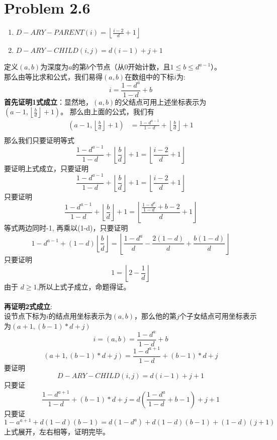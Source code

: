 \documentclass[twocolumn]{ctexart}
\begin{document}
\section*{Problem 2.6}
	\begin{enumerate}
		\item $D-ARY-PARENT(i)=\left\lfloor\frac{i-2}{d}+1\right\rfloor$
		\item $D-ARY-CHILD(i, j)= d(i-1) + j +1$
	\end{enumerate}
	\indent 定义$\left(a,b\right)$为深度为$a$的第$b$个节点（从0开始计数，且$1\leq b \leq d^{a-1}$）。
	\\那么由等比求和公式，我们易得$\left(a,b\right)$在数组中的下标$i$为:
	\begin{displaymath}
		i=\frac{1-d^{a}}{1-d}+b
	\end{displaymath}
	\indent \textbf{首先证明1式成立}：显然地，$\left(a,b\right)$的父结点可用上述坐标表示为$\left(a-1,\left\lfloor\frac{b}{d}\right\rfloor+1\right)$。
	那么由上面的公式，我们有
	\begin{eqnarray*}
		\left(a-1,\left\lfloor\frac{b}{d}\right\rfloor+1\right) &= \frac{1-d^{a-1}}{1-d} +\left\lfloor\frac{b}{d}\right\rfloor +1\\
	\end{eqnarray*}
	那么我们只要证明等式
	\begin{equation*}
		\frac{1-d^{a-1}}{1-d} +\left\lfloor\frac{b}{d}\right\rfloor +1 = \left\lfloor\frac{i-2}{d}+1\right\rfloor
	\end{equation*}
	要证明上式成立，只要证明
	\begin{equation*}
	\frac{1-d^{a-1}}{1-d} +\left\lfloor\frac{b}{d}\right\rfloor +1 = \left\lfloor\frac{i-2}{d}+1\right\rfloor
	\end{equation*}	
	只要证明
		\begin{equation*}
	\frac{1-d^{a-1}}{1-d} +\left\lfloor\frac{b}{d}\right\rfloor +1 = \left\lfloor\frac{\frac{1-d^{a}}{1-d}+b-2}{d}+1\right\rfloor
	\end{equation*}		
	等式两边同时-1,
再乘以(1-d)，只要证明
	\begin{equation*}
	1-d^{a-1}+(1-d)\left\lfloor\frac{b}{d}\right\rfloor=\left\lfloor\frac{1-d^{a}}{d}-\frac{2(1-d)}{d}+\frac{b(1-d)}{d}\right\rfloor
	\end{equation*}
	只要证明
	\begin{equation*}
		1=\left\lfloor2-\frac{1}{d}\right\rfloor
	\end{equation*}
	由于 $d \ge 1$,所以上式子成立，命题得证。\\
	~\\
	\indent \textbf{再证明2式成立}:\\
	设节点下标为$i$的结点用坐标表示为$(a,b)$，那么他的第$j$个子女结点可用坐标表示为$(a+1,(b-1)*d+j)$\\
	\[
		i=(a,b)=\frac{1-d^{a}}{1-d}+b		
	\]
	\[
		(a+1,(b-1)*d+j)=\frac{1-d^{a+1}}{1-d}+(b-1)*d+j
	\]
	要证明
	\[D-ARY-CHILD(i, j)= d(i-1) + j +1\]
	只要证
	\[
		\frac{1-d^{a+1}}{1-d}+(b-1)*d+j=d(\frac{1-d^{a}}{1-d}+b-1)+j+1
	\]
	只要证
	\[
		1-a^{a+1}+d(1-d)(b-1)=d(1-d^{a})+d(1-d)(b-1)+(1-d)(j+1)
	\]
	上式展开，左右相等，证明完毕。\\
	
\end{document}
